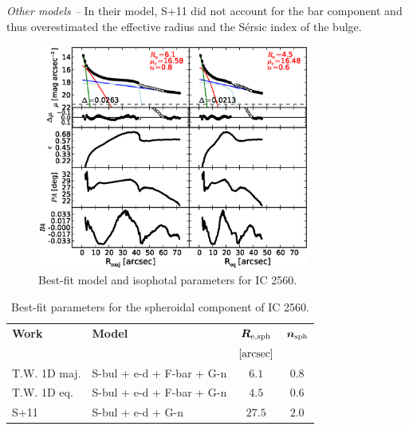 \documentclass[preprint2]{emulateapj}
\newcommand{\fitfigurewidth}{0.8\textwidth}
\begin{document}
  \emph{Other models -- } 
  In their model, S+11 did not account for the bar component and thus overestimated the effective radius and the S\'ersic index of the bulge. 

  \begin{figure}[h]
  \begin{center}
  \includegraphics[width=\fitfigurewidth]{images/ic2560_1Dfit.eps}
  \caption{Best-fit model and isophotal parameters for IC 2560.}
  \end{center}
  \end{figure}

  \begin{table}[h]
  \small
  \caption{Best-fit parameters for the spheroidal component of IC 2560.}
  \begin{center}
  \begin{tabular}{llcc}
  \hline
  {\bf Work} & {\bf Model}   & $\bm R_{\rm e,sph}$    & $\bm n_{\rm sph}$ \\
    &  &  $[\rm arcsec]$ & \\
  \hline
  T.W. 1D maj. & S-bul + e-d + F-bar + G-n & $6.1$  &  $0.8$ \\
  T.W. 1D eq.  & S-bul + e-d + F-bar + G-n & $4.5$  &  $0.6$ \\
  \hline
  S+11         & S-bul + e-d + G-n & $27.5$  &  $2.0$ \\
  \hline
  \end{tabular}
  \end{center}
  \label{tab:ic2560}
  \end{table}
\end{document}
